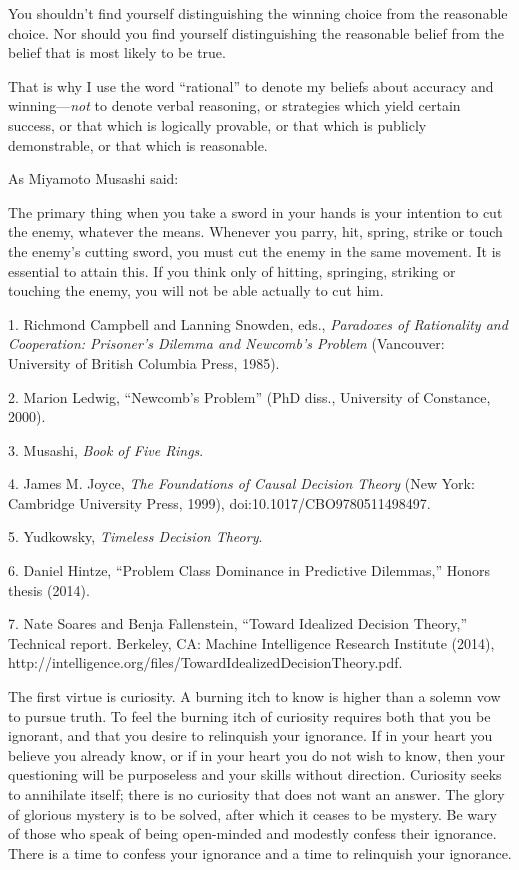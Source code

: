 {
 You shouldn't find yourself distinguishing the
winning choice from the reasonable choice. Nor should you find yourself
distinguishing the reasonable belief from the belief that is most
likely to be true.}

{
 That is why I use the word
``rational'' to denote my beliefs
about accuracy and winning---\textit{not} to denote verbal reasoning,
or strategies which yield certain success, or that which is logically
provable, or that which is publicly demonstrable, or that which is
reasonable.}

{
 As Miyamoto Musashi said:}

{
 The primary thing when you take a sword in your hands is your
intention to cut the enemy, whatever the means. Whenever you parry,
hit, spring, strike or touch the enemy's cutting sword,
you must cut the enemy in the same movement. It is essential to attain
this. If you think only of hitting, springing, striking or touching the
enemy, you will not be able actually to cut him.}

\myendsectiontext


\bigskip

{
 1. Richmond Campbell and Lanning Snowden, eds., \textit{Paradoxes
of Rationality and Cooperation: Prisoner's Dilemma and
Newcomb's Problem} (Vancouver: University of British
Columbia Press, 1985).}

{
 2. Marion Ledwig, ``Newcomb's
Problem'' (PhD diss., University of Constance,
2000).}

{
 3. Musashi, \textit{Book of Five Rings}.}

{
 4. James M. Joyce, \textit{The Foundations of Causal Decision
Theory} (New York: Cambridge University Press, 1999),
doi:10.1017/CBO9780511498497.}

{
 5. Yudkowsky, \textit{Timeless Decision Theory}.}

{
 6. Daniel Hintze, ``Problem Class Dominance in
Predictive Dilemmas,'' Honors thesis (2014).}

{
 7. Nate Soares and Benja Fallenstein, ``Toward
Idealized Decision Theory,'' Technical report.
Berkeley, CA: Machine Intelligence Research Institute (2014),
http://intelligence.org/files/TowardIdealizedDecisionTheory.pdf.}


{
 The first virtue is curiosity. A burning itch to know is higher
than a solemn vow to pursue truth. To feel the burning itch of
curiosity requires both that you be ignorant, and that you desire to
relinquish your ignorance. If in your heart you believe you already
know, or if in your heart you do not wish to know, then your
questioning will be purposeless and your skills without direction.
Curiosity seeks to annihilate itself; there is no curiosity that does
not want an answer. The glory of glorious mystery is to be solved,
after which it ceases to be mystery. Be wary of those who speak of
being open-minded and modestly confess their ignorance. There is a time
to confess your ignorance and a time to relinquish your ignorance.}

